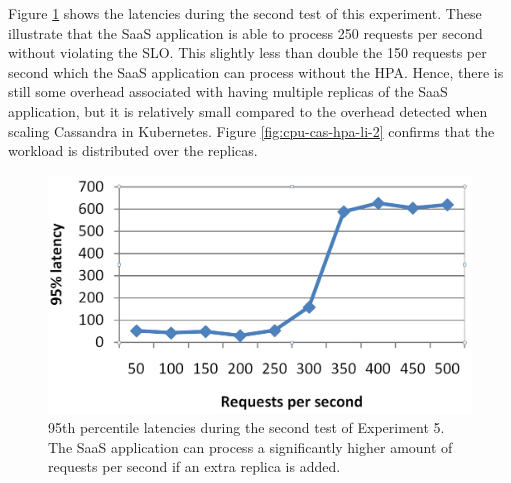 Figure \ref{fig:lat-saas-hpa-li} shows the latencies during the second test of this experiment. These illustrate that the SaaS application is able to process 250 requests per second without violating the SLO. This slightly less than double the 150 requests per second which the SaaS application can process without the HPA. Hence, there is still some overhead associated with having multiple replicas of the SaaS application, but it is relatively small compared to the overhead detected when scaling Cassandra in Kubernetes. Figure \ref{fig:cpu-cas-hpa-li-2} confirms that the workload is distributed over the replicas.

\begin{figure}
\centering
\includegraphics[width=0.60\columnwidth]{Images/Experiments/CPU/Latencies/lat-saas-hpa-li.PNG}
\caption{95th percentile latencies during the second test of Experiment 5. The SaaS application can process a significantly higher amount of requests per second if an extra replica is added.}
\label{fig:lat-saas-hpa-li}
\end{figure}


